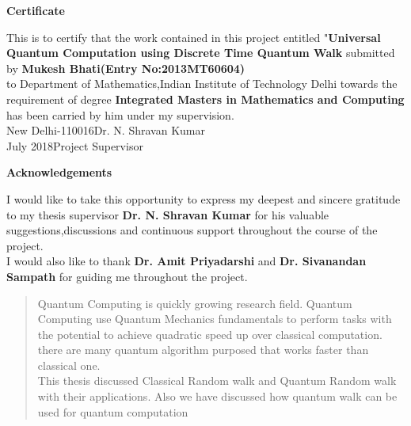 \documentclass[11 pt]{article}
\theoremstyle{definition}
\theoremstyle{remark}
\begin{document}
\thispagestyle{empty}
\newpage
\begin{center}
\begin{large}
 \textbf{Certificate}
\end{large}
\end{center}
This is to certify that the work contained in this project entitled "\textbf{Universal Quantum Computation using Discrete Time Quantum Walk} submitted by \textbf{Mukesh Bhati(Entry No:2013MT60604)}\\to Department of Mathematics,Indian Institute of Technology Delhi towards the requirement of degree \textbf{Integrated Masters in Mathematics and Computing} has been carried by him under my supervision.\\



\vspace{20 mm}
New Delhi-110016\hspace{160 pt}Dr. N. Shravan Kumar\\
\hspace*{20 pt} July 2018\hspace{210 pt}Project Supervisor

\thispagestyle{empty}

\newpage
\begin{center}
\begin{large}
 \textbf{Acknowledgements}
\end{large}
\end{center}
I would like to take this opportunity to express my deepest and sincere gratitude to my thesis supervisor \textbf{Dr. N. Shravan Kumar} for his valuable suggestions,discussions and continuous support throughout the course of the project.\\

I would also like to thank \textbf{Dr. Amit Priyadarshi} and \textbf{ Dr. Sivanandan Sampath} for guiding me throughout the project.

\newpage
\tableofcontents

\newpage
\begin{abstract}

{Quantum Computing is quickly growing research field. Quantum Computing use Quantum Mechanics fundamentals to perform tasks with the potential to achieve quadratic speed up over classical computation. there are many quantum algorithm purposed that works faster than classical one.\\

This thesis discussed Classical Random walk and Quantum Random walk with their applications. Also we have discussed how quantum walk can be used for quantum computation}
 
\end{abstract}
\end{document}
